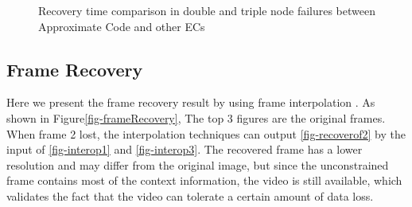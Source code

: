 \documentclass[sigconf]{acmart}
\begin{document}
\begin{figure}[ht]
    \vspace{-0.3cm}
    \caption{Recovery time comparison in double and triple node failures between Approximate Code and other ECs}\label{fig-recovery}
    \end{figure}

\subsection{Frame Recovery}
Here we present the frame recovery result by using frame interpolation \cite{meyer2015phase, niklaus2018context,van2017frame}. As shown in Figure\ref{fig-frameRecovery}, The top 3 figures are the original frames. When frame 2 lost, the interpolation techniques can output \ref{fig-recoverof2} by the input of \ref{fig-interop1} and \ref{fig-interop3}. The recovered frame has a lower resolution and may differ from the original image, but since the unconstrained frame contains most of the context information, the video is still available, which validates the fact that the video can tolerate a certain amount of data loss.
\end{document}
